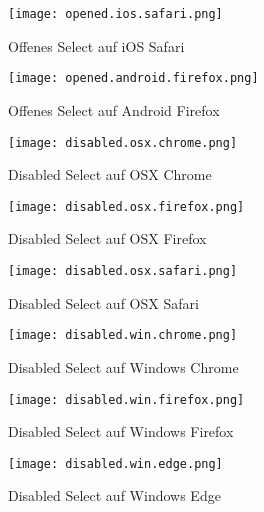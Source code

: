 \begin{figure}[!htb]
    \centering
    \begin{minipage}[b]{0.45\textwidth}
        \centering
        \texttt{[image: opened.ios.safari.png]}
        \caption{\centering Offenes Select auf iOS Safari}
        \label{img:openedIosSafariSelect}
    \end{minipage}
    \hfill
    \begin{minipage}[b]{0.45\textwidth}
        \centering
        \texttt{[image: opened.android.firefox.png]}
        \caption{\centering Offenes Select auf Android Firefox}
        \label{img:openedAndroidFirefoxSelect}
    \end{minipage}
\end{figure}


\begin{figure}[!htb]
    \centering
    \begin{minipage}[b]{0.28\textwidth}
        \centering
        \texttt{[image: disabled.osx.chrome.png]}
        \caption{\centering Disabled Select auf OSX Chrome}
        \label{img:disabledOsxChromeSelect}
    \end{minipage}
    \hfill
    \begin{minipage}[b]{0.28\textwidth}
        \centering
        \texttt{[image: disabled.osx.firefox.png]}
        \caption{\centering Disabled Select auf OSX Firefox}
        \label{img:disabledOsxFirefoxSelect}
    \end{minipage}
    \hfill
    \begin{minipage}[b]{0.28\textwidth}
        \centering
        \texttt{[image: disabled.osx.safari.png]}
        \caption{\centering Disabled Select auf OSX Safari}
        \label{img:disabledOsxSafariSelect}
    \end{minipage}
\end{figure}

\begin{figure}[!htb]
    \centering
    \begin{minipage}[b]{0.28\textwidth}
        \centering
        \texttt{[image: disabled.win.chrome.png]}
        \caption{\centering Disabled Select auf Windows Chrome}
        \label{img:disabledWinChromeSelect}
    \end{minipage}
    \hfill
    \begin{minipage}[b]{0.28\textwidth}
        \centering
        \texttt{[image: disabled.win.firefox.png]}
        \caption{\centering Disabled Select auf Windows Firefox}
        \label{img:disabledWinFirefoxSelect}
    \end{minipage}
    \hfill
    \begin{minipage}[b]{0.28\textwidth}
        \centering
        \texttt{[image: disabled.win.edge.png]}
        \caption{\centering Disabled Select auf Windows Edge}
        \label{img:disabledWinEdgeSelect}
    \end{minipage}
\end{figure}

